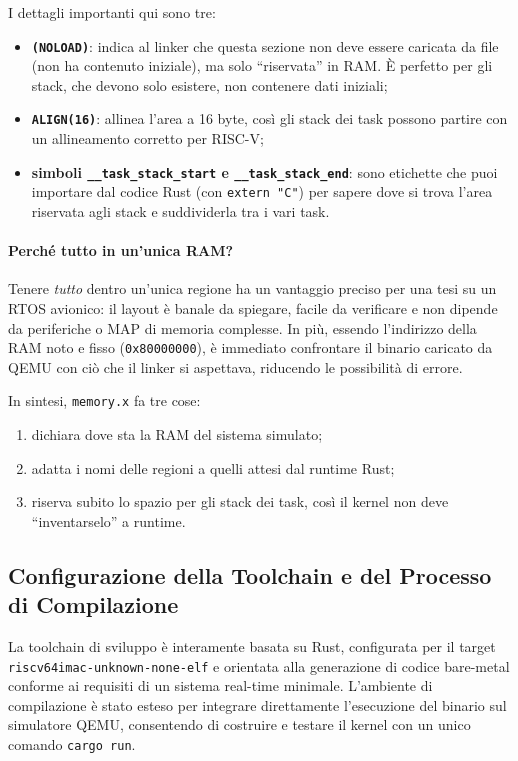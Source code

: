 \documentclass[italian, Lau, oneside]{sapthesis} %
\begin{document}
I dettagli importanti qui sono tre:

\begin{itemize}
    \item \textbf{\texttt{(NOLOAD)}}: indica al linker che questa sezione non deve essere caricata da file (non ha contenuto iniziale), ma solo “riservata” in RAM. È perfetto per gli stack, che devono solo esistere, non contenere dati iniziali;
    \item \textbf{\texttt{ALIGN(16)}}: allinea l’area a 16 byte, così gli stack dei task possono partire con un allineamento corretto per RISC-V;
    \item \textbf{simboli \texttt{\_\_task\_stack\_start} e \texttt{\_\_task\_stack\_end}}: sono etichette che puoi importare dal codice Rust (con \texttt{extern "C"}) per sapere dove si trova l’area riservata agli stack e suddividerla tra i vari task.
\end{itemize}

\paragraph{Perché tutto in un’unica RAM?}
Tenere \emph{tutto} dentro un’unica regione ha un vantaggio preciso per una tesi su un RTOS avionico: il layout è banale da spiegare, facile da verificare e non dipende da periferiche o MAP di memoria complesse.  
In più, essendo l’indirizzo della RAM noto e fisso (\texttt{0x80000000}), è immediato confrontare il binario caricato da QEMU con ciò che il linker si aspettava, riducendo le possibilità di errore.

\newpage
In sintesi, \texttt{memory.x} fa tre cose:
\begin{enumerate}
    \item dichiara dove sta la RAM del sistema simulato;
    \item adatta i nomi delle regioni a quelli attesi dal runtime Rust;
    \item riserva subito lo spazio per gli stack dei task, così il kernel non deve “inventarselo” a runtime.
\end{enumerate}

\subsection{Configurazione della Toolchain e del Processo di Compilazione}

La toolchain di sviluppo è interamente basata su Rust, configurata per il target \texttt{riscv64imac-unknown-none-elf} e orientata alla generazione di codice bare-metal conforme ai requisiti di un sistema real-time minimale.  
L’ambiente di compilazione è stato esteso per integrare direttamente l’esecuzione del binario sul simulatore QEMU, consentendo di costruire e testare il kernel con un unico comando \texttt{cargo run}.
\end{document}
